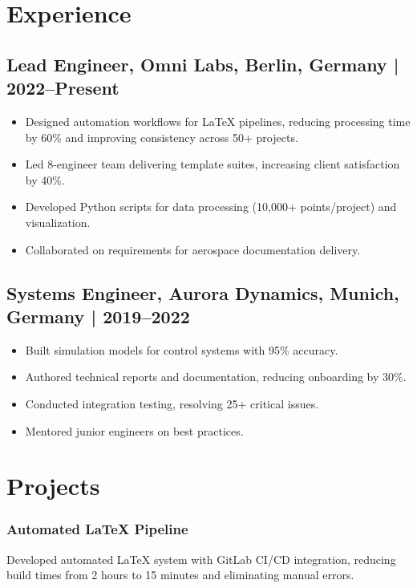 \documentclass[
    language=english,
    doctype=cv,
    institution=none,
    titlestyle=cv
]{../../omnilatex}
\begin{document}
\maketitle

\begin{multicols}{2}

    \section{Experience}
    \subsection{Lead Engineer, Omni Labs, Berlin, Germany | 2022--Present}
    \begin{itemize}
        \item Designed automation workflows for LaTeX pipelines, reducing processing time by 60\% and improving consistency across 50+ projects.
        \item Led 8-engineer team delivering template suites, increasing client satisfaction by 40\%.
        \item Developed Python scripts for data processing (10,000+ points/project) and visualization.
        \item Collaborated on requirements for aerospace documentation delivery.
    \end{itemize}

    \subsection{Systems Engineer, Aurora Dynamics, Munich, Germany | 2019--2022}
    \begin{itemize}
        \item Built simulation models for control systems with 95\% accuracy.
        \item Authored technical reports and documentation, reducing onboarding by 30\%.
        \item Conducted integration testing, resolving 25+ critical issues.
        \item Mentored junior engineers on best practices.
    \end{itemize}

    \section{Projects}
    \subsubsection{Automated LaTeX Pipeline \faLink}
    Developed automated LaTeX system with GitLab CI/CD integration, reducing build times from 2 hours to 15 minutes and eliminating manual errors.


\end{multicols}
\end{document}
